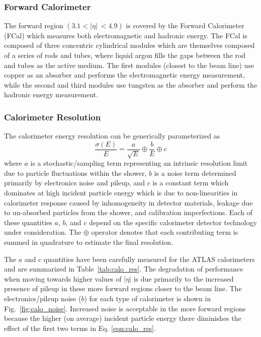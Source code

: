 \subsubsection{Forward Calorimeter}
The forward region $(3.1 < |\eta|\ < 4.9)$ is covered by the Forward Calorimeter (FCal) which measures both electromagnetic and hadronic energy.
The FCal is composed of three concentric cylindrical modules which are themselves composed of a series of rods and tubes, where liquid argon fills the gaps between the rod and tubes as the active medium.
The first modules (closest to the beam line) use copper as an absorber and performs the electromagnetic energy measurement, while the second and third modules use tungsten as the absorber and perform the hadronic energy measurement.

\subsubsection{Calorimeter Resolution}
The calorimeter energy resolution can be generically parameterized as
\begin{equation}
    \frac{\sigma(E)}{E} = \frac{a}{\sqrt{E}} \oplus \frac{b}{E} \oplus c
    \label{eqn:calo_res}
\end{equation}
where $a$ is a stochastic/sampling term representing an intrinsic resolution limit due to particle fluctuations within the shower, $b$ is a noise term determined primarily by electronics noise and pileup, and $c$ is a constant term which dominates at high incident particle energy which is due to non-linearities in calorimeter response caused by inhomogeneity in detector materials, leakage due to un-absorbed particles from the shower, and calibration imperfections.
Each of these quantities $a$, $b$, and $c$ depend on the specific calorimeter detector technology under consideration.
The $\oplus$ operator denotes that each contributing term is summed in quadrature to estimate the final resolution.

The $a$ and $c$ quantities have been carefully measured for the ATLAS calorimeters \cite{Aharrouche_2006, Strizenec:2009zz, Cojocaru:2004jk, Adragna:2009zz} and are summarized in Table~\ref{tab:calo_res}.
The degradation of performance when moving towards higher values of $|\eta|$ is due primarily to the increased presence of pileup in these more forward regions closer to the beam line.
The electronics/pileup noise ($b$) for each type of calorimeter is shown in Fig.~\ref{fig:calo_noise}.
Increased noise is acceptable in the more forward regions because the higher (on average) incident particle energy there diminishes the effect of the first two terms in Eq. \ref{eqn:calo_res}.

